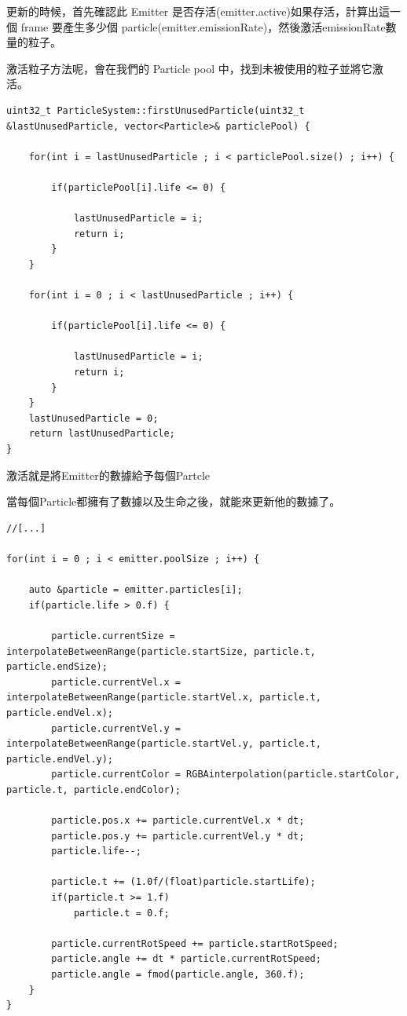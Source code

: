 更新的時候，首先確認此 Emitter 是否存活(emitter.active)如果存活，計算出這一個 frame 要產生多少個 particle(emitter.emissionRate)，然後激活emissionRate數量的粒子。

激活粒子方法呢，會在我們的 Particle pool 中，找到未被使用的粒子並將它激活。

\begin{lstlisting}
uint32_t ParticleSystem::firstUnusedParticle(uint32_t &lastUnusedParticle, vector<Particle>& particlePool) {

    for(int i = lastUnusedParticle ; i < particlePool.size() ; i++) {

        if(particlePool[i].life <= 0) {

            lastUnusedParticle = i;
            return i;
        }
    }

    for(int i = 0 ; i < lastUnusedParticle ; i++) {

        if(particlePool[i].life <= 0) {

            lastUnusedParticle = i;
            return i;
        }
    }
    lastUnusedParticle = 0;
    return lastUnusedParticle;
}
\end{lstlisting}

激活就是將Emitter的數據給予每個Partcle

當每個Particle都擁有了數據以及生命之後，就能來更新他的數據了。

\begin{lstlisting}
//[...]

for(int i = 0 ; i < emitter.poolSize ; i++) {

    auto &particle = emitter.particles[i];
    if(particle.life > 0.f) {

        particle.currentSize = interpolateBetweenRange(particle.startSize, particle.t, particle.endSize);
        particle.currentVel.x = interpolateBetweenRange(particle.startVel.x, particle.t, particle.endVel.x);
        particle.currentVel.y = interpolateBetweenRange(particle.startVel.y, particle.t, particle.endVel.y);
        particle.currentColor = RGBAinterpolation(particle.startColor, particle.t, particle.endColor);

        particle.pos.x += particle.currentVel.x * dt;
        particle.pos.y += particle.currentVel.y * dt;
        particle.life--;

        particle.t += (1.0f/(float)particle.startLife);
        if(particle.t >= 1.f)
            particle.t = 0.f;

        particle.currentRotSpeed += particle.startRotSpeed;
        particle.angle += dt * particle.currentRotSpeed;
        particle.angle = fmod(particle.angle, 360.f);
    }
}
\end{lstlisting}

